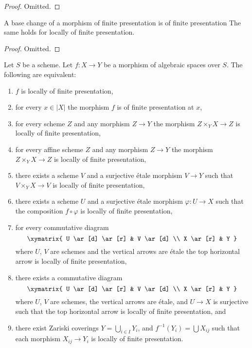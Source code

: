 \begin{proof}
Omitted.
\end{proof}

\begin{lemma}
\label{lemma-base-change-finite-presentation}
A base change of a morphism of finite presentation is of finite presentation
The same holds for locally of finite presentation.
\end{lemma}

\begin{proof}
Omitted.
\end{proof}

\begin{lemma}
\label{lemma-finite-presentation-local}
Let $S$ be a scheme.
Let $f : X \to Y$ be a morphism of algebraic spaces over $S$.
The following are equivalent:
\begin{enumerate}
\item $f$ is locally of finite presentation,
\item for every $x \in |X|$ the morphism $f$ is of finite presentation at $x$,
\item for every scheme $Z$ and any morphism $Z \to Y$ the morphism
$Z \times_Y X \to Z$ is locally of finite presentation,
\item for every affine scheme $Z$ and any morphism
$Z \to Y$ the morphism $Z \times_Y X \to Z$ is locally of finite presentation,
\item there exists a scheme $V$ and a surjective \'etale morphism
$V \to Y$ such that $V \times_Y X \to V$ is
locally of finite presentation,
\item there exists a scheme $U$ and a surjective \'etale morphism
$\varphi : U \to X$ such that the composition $f \circ \varphi$
is locally of finite presentation,
\item for every commutative diagram
$$
\xymatrix{
U \ar[d] \ar[r] & V \ar[d] \\
X \ar[r] & Y
}
$$
where $U$, $V$ are schemes and the vertical arrows are \'etale
the top horizontal arrow is locally of finite presentation,
\item there exists a commutative diagram
$$
\xymatrix{
U \ar[d] \ar[r] & V \ar[d] \\
X \ar[r] & Y
}
$$
where $U$, $V$ are schemes, the vertical arrows are \'etale, and
$U \to X$ is surjective such that the top horizontal arrow is
locally of finite presentation, and
\item there exist Zariski coverings $Y = \bigcup_{i \in I} Y_i$,
and $f^{-1}(Y_i) = \bigcup X_{ij}$ such that
each morphism $X_{ij} \to Y_i$ is locally of finite presentation.
\end{enumerate}
\end{lemma}

